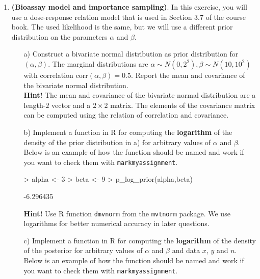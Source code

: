 \documentclass[11pt,a4paper,english]{article}
\begin{document}
\begin{enumerate}

\item {\bf (Bioassay model and importance sampling)}. In this exercise, you will use a dose-response relation model that is used in Section 3.7 of the course book. The used likelihood is the same, but
we will use a different prior distribution on the parameters $\alpha$ and $\beta$.


\begin{itemize}
    \item[a)] Construct a bivariate normal distribution as prior distribution for $(\alpha,\beta)$.
    The marginal distributions are $\alpha \sim N(0,2^2), \beta \sim N(10,10^2)$ with correlation $\mathrm{corr}(\alpha, \beta)=0.5$. Report the mean and covariance
    of the bivariate normal distribution.\\
\textbf{Hint!} The mean and covariance of the bivariate normal distribution are a length-$2$ vector and a $2 \times 2$ matrix. The elements of the covariance matrix can be computed using the relation of correlation and covariance.
  \item[b)] Implement a function in R for computing the \textbf{logarithm} of the density of the
  prior distribution in a) for arbitrary values of $\alpha$ and $\beta$. Below is an example of how the function should be named and work if you want to check them with \texttt{markmyassignment}. 
  
\begin{Schunk}
\begin{Sinput}
> alpha <- 3
> beta <- 9
> p_log_prior(alpha,beta)
\end{Sinput}
\begin{Soutput}
[1] -6.296435
\end{Soutput}
\end{Schunk}
 
\textbf{Hint!} Use R function {\tt dmvnorm} from the {\tt mvtnorm} package. We use logarithms for better numerical accuracy in later questions.

\item[c)] Implement a function in R for computing the \textbf{logarithm} of the density of the posterior for arbitrary values of $\alpha$ and $\beta$ and data $x$, $y$ and $n$. Below is an example of how the function should be named and work if you want to check them with \texttt{markmyassignment}. 
 

\end{itemize}
\end{enumerate}
\end{document}
